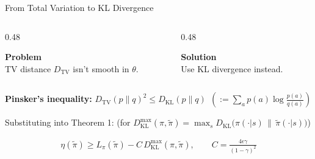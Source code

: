 \documentclass[aspectratio=169]{beamer}
\newcommand{\DKL}{D_{\mathrm{KL}}}
\newcommand{\DTV}{D_{\mathrm{TV}}}
\begin{document}
\begin{frame}{From Total Variation to KL Divergence}
  \vspace{2pt}
  \begin{columns}[t]
    \begin{column}{0.48\textwidth}
      \begin{tcolorbox}[colback=BadRed!8, colframe=BadRed!60, arc=2pt, boxrule=0.8pt,
                        left=4pt, right=4pt, top=4pt, bottom=4pt]
        \small\textbf{\color{BadRed}Problem}\\[2pt]
        \footnotesize TV distance $\DTV$ isn't smooth in $\theta$.
      \end{tcolorbox}
    \end{column}
    \begin{column}{0.48\textwidth}
      \begin{tcolorbox}[colback=GoodGreen!8, colframe=GoodGreen!60, arc=2pt, boxrule=0.8pt,
                        left=4pt, right=4pt, top=4pt, bottom=4pt]
        \small\textbf{\color{GoodGreen!70!black}Solution}\\[2pt]
        \footnotesize Use KL divergence instead.
      \end{tcolorbox}
    \end{column}
  \end{columns}

  \vspace{10pt}
  \small

  \textbf{Pinsker's inequality:} {\color{AtlasAccent}$\DTV(p\|q)^2 \le \DKL(p\|q)~~\left(:=\sum_a p(a)\log\frac{p(a)}{q(a)}\right)$}

  \vspace{10pt}
  Substituting into Theorem 1: {\small (for $\DKL^{\max}(\pi,\tilde\pi) = \max_s \DKL\big(\pi(\cdot|s)\,\|\,\tilde\pi(\cdot|s)\big)$)}
  \begin{formulabox}
    \small
    \begin{gather*}
      \eta(\tilde\pi) \ge L_\pi(\tilde\pi) - C\,\DKL^{\max}(\pi,\tilde\pi), \qquad C = \frac{4\epsilon\gamma}{(1-\gamma)^2}
    \end{gather*}
    \vspace{4pt}
  \end{formulabox}
  

\end{frame}
\end{document}
